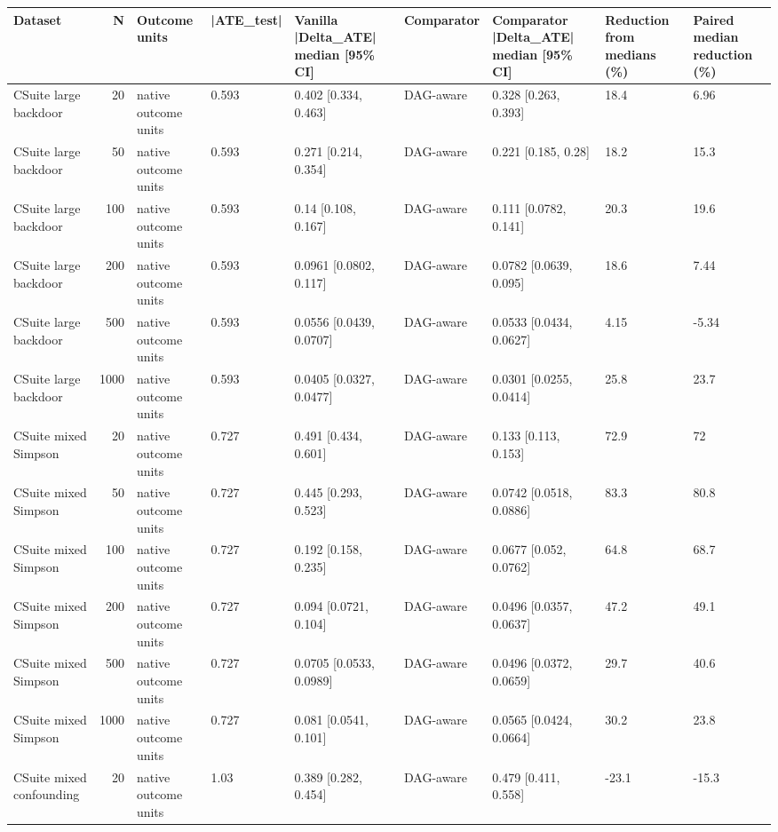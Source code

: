 \begin{tabular}{lrlllllll}
\toprule
Dataset & N & Outcome units & |ATE\_test| & Vanilla |Delta\_ATE| median [95\% CI] & Comparator & Comparator |Delta\_ATE| median [95\% CI] & Reduction from medians (\%) & Paired median reduction (\%) \\
\midrule
CSuite large backdoor & 20 & native outcome units & 0.593 & 0.402 [0.334, 0.463] & DAG-aware & 0.328 [0.263, 0.393] & 18.4 & 6.96 \\
CSuite large backdoor & 50 & native outcome units & 0.593 & 0.271 [0.214, 0.354] & DAG-aware & 0.221 [0.185, 0.28] & 18.2 & 15.3 \\
CSuite large backdoor & 100 & native outcome units & 0.593 & 0.14 [0.108, 0.167] & DAG-aware & 0.111 [0.0782, 0.141] & 20.3 & 19.6 \\
CSuite large backdoor & 200 & native outcome units & 0.593 & 0.0961 [0.0802, 0.117] & DAG-aware & 0.0782 [0.0639, 0.095] & 18.6 & 7.44 \\
CSuite large backdoor & 500 & native outcome units & 0.593 & 0.0556 [0.0439, 0.0707] & DAG-aware & 0.0533 [0.0434, 0.0627] & 4.15 & -5.34 \\
CSuite large backdoor & 1000 & native outcome units & 0.593 & 0.0405 [0.0327, 0.0477] & DAG-aware & 0.0301 [0.0255, 0.0414] & 25.8 & 23.7 \\
CSuite mixed Simpson & 20 & native outcome units & 0.727 & 0.491 [0.434, 0.601] & DAG-aware & 0.133 [0.113, 0.153] & 72.9 & 72 \\
CSuite mixed Simpson & 50 & native outcome units & 0.727 & 0.445 [0.293, 0.523] & DAG-aware & 0.0742 [0.0518, 0.0886] & 83.3 & 80.8 \\
CSuite mixed Simpson & 100 & native outcome units & 0.727 & 0.192 [0.158, 0.235] & DAG-aware & 0.0677 [0.052, 0.0762] & 64.8 & 68.7 \\
CSuite mixed Simpson & 200 & native outcome units & 0.727 & 0.094 [0.0721, 0.104] & DAG-aware & 0.0496 [0.0357, 0.0637] & 47.2 & 49.1 \\
CSuite mixed Simpson & 500 & native outcome units & 0.727 & 0.0705 [0.0533, 0.0989] & DAG-aware & 0.0496 [0.0372, 0.0659] & 29.7 & 40.6 \\
CSuite mixed Simpson & 1000 & native outcome units & 0.727 & 0.081 [0.0541, 0.101] & DAG-aware & 0.0565 [0.0424, 0.0664] & 30.2 & 23.8 \\
CSuite mixed confounding & 20 & native outcome units & 1.03 & 0.389 [0.282, 0.454] & DAG-aware & 0.479 [0.411, 0.558] & -23.1 & -15.3 \\

\end{tabular}
